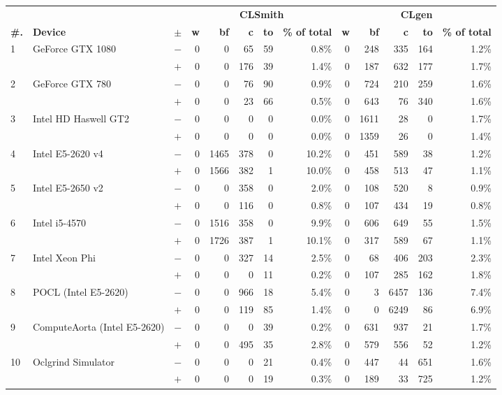   \begin{tabular}{lll | rrrrr | rrrrr }
  \toprule
  & & & \multicolumn{5}{c|}{\textbf{CLSmith}} & \multicolumn{5}{c}{\textbf{CLgen}} \\
  \textbf{\#.} & \textbf{Device} & $\pm$ &
  \textbf{w} & \textbf{bf} & \textbf{c} & \textbf{to} & \textbf{\% of total} &
  \textbf{w} & \textbf{bf} & \textbf{c} & \textbf{to} & \textbf{\% of total} \\
  \midrule
  \multirow{ 2}{*}{1} & \multirow{ 2}{*}{GeForce GTX 1080} & $-$ & 0 & 0 & 65 & 59 & 0.8\%       & 0 & 248 & 335 & 164 & 1.2\% \\& & $+$ & 0 & 0 & 176 & 39 & 1.4\% & 0 & 187 & 632 & 177 & 1.7\% \\
\hline
\multirow{ 2}{*}{2} & \multirow{ 2}{*}{GeForce GTX 780} & $-$ & 0 & 0 & 76 & 90 & 0.9\%       & 0 & 724 & 210 & 259 & 1.6\% \\& & $+$ & 0 & 0 & 23 & 66 & 0.5\% & 0 & 643 & 76 & 340 & 1.6\% \\
\hline
\multirow{ 2}{*}{3} & \multirow{ 2}{*}{Intel HD Haswell GT2} & $-$ & 0 & 0 & 0 & 0 & 0.0\%       & 0 & 1611 & 28 & 0 & 1.7\% \\& & $+$ & 0 & 0 & 0 & 0 & 0.0\% & 0 & 1359 & 26 & 0 & 1.4\% \\
\hline
\multirow{ 2}{*}{4} & \multirow{ 2}{*}{Intel E5-2620 v4} & $-$ & 0 & 1465 & 378 & 0 & 10.2\%       & 0 & 451 & 589 & 38 & 1.2\% \\& & $+$ & 0 & 1566 & 382 & 1 & 10.0\% & 0 & 458 & 513 & 47 & 1.1\% \\
\hline
\multirow{ 2}{*}{5} & \multirow{ 2}{*}{Intel E5-2650 v2} & $-$ & 0 & 0 & 358 & 0 & 2.0\%       & 0 & 108 & 520 & 8 & 0.9\% \\& & $+$ & 0 & 0 & 116 & 0 & 0.8\% & 0 & 107 & 434 & 19 & 0.8\% \\
\hline
\multirow{ 2}{*}{6} & \multirow{ 2}{*}{Intel i5-4570} & $-$ & 0 & 1516 & 358 & 0 & 9.9\%       & 0 & 606 & 649 & 55 & 1.5\% \\& & $+$ & 0 & 1726 & 387 & 1 & 10.1\% & 0 & 317 & 589 & 67 & 1.1\% \\
\hline
\multirow{ 2}{*}{7} & \multirow{ 2}{*}{Intel Xeon Phi} & $-$ & 0 & 0 & 327 & 14 & 2.5\%       & 0 & 68 & 406 & 203 & 2.3\% \\& & $+$ & 0 & 0 & 0 & 11 & 0.2\% & 0 & 107 & 285 & 162 & 1.8\% \\
\hline
\multirow{ 2}{*}{8} & \multirow{ 2}{*}{POCL (Intel E5-2620)} & $-$ & 0 & 0 & 966 & 18 & 5.4\%       & 0 & 3 & 6457 & 136 & 7.4\% \\& & $+$ & 0 & 0 & 119 & 85 & 1.4\% & 0 & 0 & 6249 & 86 & 6.9\% \\
\hline
\multirow{ 2}{*}{9} & \multirow{ 2}{*}{ComputeAorta (Intel E5-2620)} & $-$ & 0 & 0 & 0 & 39 & 0.2\%       & 0 & 631 & 937 & 21 & 1.7\% \\& & $+$ & 0 & 0 & 495 & 35 & 2.8\% & 0 & 579 & 556 & 52 & 1.2\% \\
\hline
\multirow{ 2}{*}{10} & \multirow{ 2}{*}{Oclgrind Simulator} & $-$ & 0 & 0 & 0 & 21 & 0.4\%       & 0 & 447 & 44 & 651 & 1.6\% \\& & $+$ & 0 & 0 & 0 & 19 & 0.3\% & 0 & 189 & 33 & 725 & 1.2\% \\
  \bottomrule
\end{tabular}

